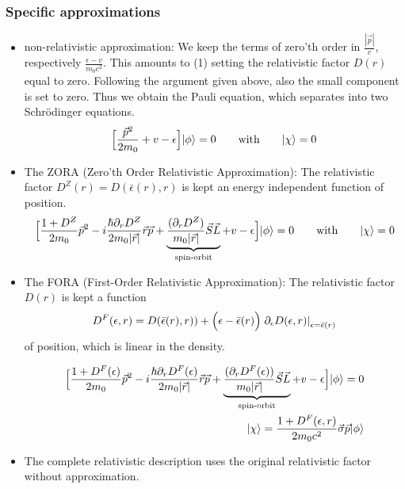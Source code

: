 \documentclass[11pt,a4paper]{report}
\begin{document}
\subsubsection{Specific approximations}
\begin{itemize}
\item non-relativistic approximation: We keep the terms of zero'th
  order in $\frac{|\vec{p}|}{c}$, respectively
  $\frac{\epsilon-v}{m_0c^2}$. This amounts to (1) setting the
  relativistic factor $D(r)$ equal to zero. Following the argument
  given above, also the small component is set to zero. Thus we
  obtain the Pauli equation, which separates into two Schr\"odinger
  equations.
  \begin{eqnarray}
  \Bigl[ \frac{\vec{p}^2}{2m_0}+v-\epsilon\Bigr]|\phi\rangle=0
\qquad\text{with}\qquad
  |\chi\rangle=0
  \end{eqnarray}
%
\item The ZORA (Zero'th Order Relativistic Approximation): The
  relativistic factor $D^{Z}(r)=D(\bar{\epsilon}(r),r)$ is kept an
  energy independent function of position.
\begin{eqnarray}
\Bigl[
\frac{1+D^Z}{2m_0}\vec{p}^2 
-i\frac{\hbar\partial_rD^Z}{2m_0|\vec{r}|}\vec{r}\vec{p} 
+ \underbrace{\frac{(\partial_r D^Z)}{m_0|\vec{r}|}
\vec{S}\vec{L}}_{\text{spin-orbit}}
+v-\epsilon\Bigr]|\phi\rangle=0
\qquad\text{with}\qquad
  |\chi\rangle=0
\end{eqnarray}
%
\item The FORA (First-Order Relativistic Approximation): The
  relativistic factor $D(r)$ is kept a function 
\begin{eqnarray}
D^{F}(\epsilon,r)=
D(\bar{\epsilon}(r),r))
+\Bigl(\epsilon-\bar{\epsilon}(r)\Bigr)
\left.\partial_\epsilon D(\epsilon,r)\right|_{\epsilon=\bar{\epsilon}(r)}
\end{eqnarray}
of position, which is
  linear in the density.

\begin{eqnarray}
\Bigl[
\frac{1+D^{F}(\epsilon)}{2m_0}\vec{p}^2 
-i\frac{\hbar\partial_rD^{F}(\epsilon)}{2m_0|\vec{r}|}\vec{r}\vec{p} 
+ \underbrace{\frac{(\partial_r D^{F}(\epsilon))}{m_0|\vec{r}|}
\vec{S}\vec{L}}_{\text{spin-orbit}}
+v-
\epsilon
\Bigr]|\phi\rangle=0
\nonumber\\
  |\chi\rangle=\frac{1+D^F(\epsilon,r)}{2m_0c^2}\vec{\sigma}\vec{p}|\phi\rangle
\end{eqnarray}
%
\item The complete relativistic description uses the original
  relativistic factor without approximation.
\end{itemize}
\end{document}

